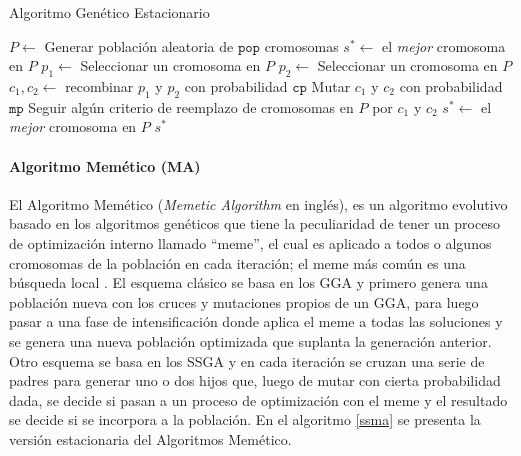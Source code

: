 \begin{algorithm}
\caption{Algoritmo Genético Estacionario}
\label{sga}
\begin{algorithmic}[1]


\State $P \gets$ Generar población aleatoria de $\texttt{pop}$ cromosomas
\State $s^* \gets $ el \emph{mejor} cromosoma en $P$
	\State $p_1 \gets$ Seleccionar un cromosoma en $P$
	\State $p_2 \gets$ Seleccionar un cromosoma en $P$
	\State $c_1, c_2 \gets $ recombinar $p_1$ y $p_2$ con probabilidad $\texttt{cp}$
	\State Mutar $c_1$ y $c_2$ con probabilidad $\texttt{mp}$
	\State Seguir algún criterio de reemplazo de cromosomas en $P$ por $c_1$ y $c_2$
		\State $s^* \gets$ el \emph{mejor} cromosoma en $P$
	\EndIf
\EndWhile
\State \Return $s^*$

\end{algorithmic}
\end{algorithm}

\paragraph{Algoritmo Memético (MA)}

El Algoritmo Memético (\emph{Memetic Algorithm} en inglés), es un algoritmo evolutivo basado en los algoritmos genéticos que tiene la peculiaridad de tener un proceso de optimización interno llamado ``meme'', el cual es aplicado a todos o algunos cromosomas de la población en cada iteración; el meme más común es una búsqueda local \cite{neri2012memetic}. El esquema clásico se basa en los GGA y primero genera una población nueva con los cruces y mutaciones propios de un GGA, para luego pasar a una fase de intensificación donde aplica el meme a todas las soluciones y se genera una nueva población optimizada que suplanta la generación anterior. Otro esquema se basa en los SSGA y en cada iteración se cruzan una serie de padres para generar uno o dos hijos que, luego de mutar con cierta probabilidad dada, se decide si pasan a un proceso de optimización con el meme y el resultado se decide si se incorpora a la población.  En el algoritmo \ref{ssma} se presenta la versión estacionaria del Algoritmos Memético.

